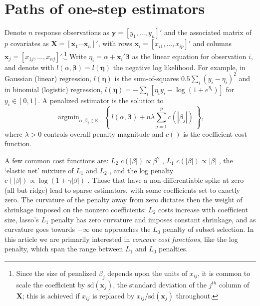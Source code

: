 \documentclass[12pt]{article}
\newcommand{\bs}[1]{\boldsymbol{#1}}
\newcommand{\mr}[1]{\mathrm{#1}}
\newcommand{\bm}[1]{\mathbf{#1}}
\newcommand{\ds}[1]{\mathds{#1}}
\DeclareMathOperator*{\argmin}{argmin}
\begin{document}
\section{Paths of one-step estimators}
\label{sec:algos}

Denote $n$ response observations as $\bm{y} = [y_1,\ldots,y_n]'$ and the associated matrix of $p$ covariates as $\bm{X} =
[\bm{x}_1 \cdots \bm{x}_n]'$, with rows $\bm{x}_i = [x_{i1},\ldots,x_{ip}]'$ and columns $\bs{x}_j = [x_{1j},\ldots,x_{nj}]'$.\footnote{Since the size of penalized $\beta_j$ depends upon the units of $x_{ij}$,  it is common to scale
the coefficient by $\mr{sd}(\bs{x}_j)$, the standard deviation of the $j^{th}$ column
of $\bm{X}$; this is achieved if $x_{ij}$ is replaced by $x_{ij}/\mr{sd}(\bs{x}_j)$
throughout.} Write $\eta_{i} =
\alpha+\bm{x}_i'\bs{\beta}$ as the linear equation for observation $i$, and
denote with $l(\alpha, \bs{\beta}) = l(\bs{\eta})$  the negative log likelihood.  For example, in Gaussian (linear)
regression, $l(\bs{\eta})$ is the sum-of-squares $0.5\sum_i \left(y_i - \eta_i\right)^2$ and in binomial (logistic)
regression,  $l(\bs{\eta}) = -\sum_i \left[\eta_iy_i -
\log(1+e^{\eta_i})\right]$ for $y_i \in [0,1]$. A penalized estimator is  the
solution to
\begin{equation} \label{pendev}
\argmin_{\alpha,\beta_j\in\ds{R}}~~\left\{~l(\alpha,{\bs{\beta}}) + n\lambda \sum_{j=1}^p c(|\beta_j|)~\right\},
\end{equation}
where $\lambda>0$ controls overall penalty magnitude and  $c()$ is the  coefficient cost function.
 
A few common cost functions are: 
$L_2$ $c(|\beta|) \propto \beta^2$ \citep[ridge,][]{hoerl_ridge_1970}, $L_1$ $c(|\beta|) \propto |\beta|$ \citep[lasso,][]{tibshirani_regression_1996}, the `elastic net' mixture of $L_1$ and $L_2$ \citep{zou_regularization_2005}, and the log penalty $c(|\beta|) \propto \log(1+\gamma|\beta|)$ \citep{candes_enhancing_2008}.  Those that have
a non-differentiable spike at zero (all but ridge) lead to sparse estimators,
with some coefficients set to exactly zero.   The curvature of the penalty
away from zero dictates then the weight of shrinkage imposed on the nonzero
coefficients:  $L_2$ costs increase with coefficient size,  lasso's $L_1$
penalty has zero curvature and imposes constant shrinkage, and as curvature
goes towards $-\infty$ one approaches the $L_0$ penalty of subset selection.
In this article we are primarily interested in {\it concave cost functions},
like the log penalty, which span the range between $L_1$ and $L_0$ penalties.
\end{document}

